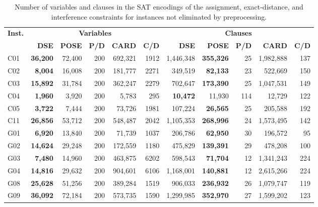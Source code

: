 \documentclass[letterpaper,journal]{IEEEtran}
\begin{document}
\begin{table}[!htbp]
\centering
\caption{Number of variables and clauses in the SAT encodings of the assignment, exact-distance, and interference constraints for instances not eliminated by preprocessing.}
\label{tab:hard_encoding_full}
\scriptsize
\setlength{\tabcolsep}{2.2pt}
\renewcommand{\arraystretch}{1.0}
\begin{tabular}{@{}lrrrrrrrrrr@{}}
\toprule
\multirow{2}{*}{\textbf{Inst.}} & \multicolumn{5}{c}{\textbf{Variables}} & \multicolumn{5}{c}{\textbf{Clauses}} \\
\cmidrule(lr){2-6}\cmidrule(lr){7-11}
& \textbf{DSE} & \textbf{POSE} & \textbf{P/D} & \textbf{CARD} & \textbf{C/D} & \textbf{DSE} & \textbf{POSE} & \textbf{P/D} & \textbf{CARD} & \textbf{C/D} \\
\midrule
C01 & \textbf{36,200} & 72,400 & 200 & 692,321 & 1912 & 1,446,348 & \textbf{355,326} & 25 & 1,982,888 & 137 \\
C02 & \textbf{8,004} & 16,008 & 200 & 181,777 & 2271 & 349,519 & \textbf{82,133} & 23 & 522,669 & 150 \\
C03 & \textbf{15,892} & 31,784 & 200 & 362,247 & 2279 & 702,647 & \textbf{173,390} & 25 & 1,047,531 & 149 \\
C04 & \textbf{1,960} & 3,920 & 200 & 5,783 & 295 & \textbf{10,472} & 11,930 & 114 & 12,729 & 122 \\
C05 & \textbf{3,722} & 7,444 & 200 & 73,726 & 1981 & 107,224 & \textbf{26,565} & 25 & 205,588 & 192 \\
C11 & \textbf{26,856} & 53,712 & 200 & 548,487 & 2042 & 1,105,353 & \textbf{268,996} & 24 & 1,573,495 & 142 \\
G01 & \textbf{6,920} & 13,840 & 200 & 71,739 & 1037 & 206,786 & \textbf{62,950} & 30 & 196,572 & 95 \\
G02 & \textbf{14,624} & 29,248 & 200 & 172,559 & 1180 & 475,829 & \textbf{139,391} & 29 & 478,208 & 100 \\
G03 & \textbf{7,480} & 14,960 & 200 & 463,875 & 6202 & 598,543 & \textbf{71,704} & 12 & 1,341,243 & 224 \\
G04 & \textbf{14,816} & 29,632 & 200 & 904,601 & 6106 & 1,168,001 & \textbf{140,881} & 12 & 2,615,266 & 224 \\
G08 & \textbf{25,628} & 51,256 & 200 & 389,284 & 1519 & 906,033 & \textbf{236,932} & 26 & 1,079,747 & 119 \\
G09 & \textbf{36,092} & 72,184 & 200 & 573,735 & 1590 & 1,299,985 & \textbf{352,970} & 27 & 1,599,202 & 123 \\

\end{tabular}
\end{table}
\end{document}
